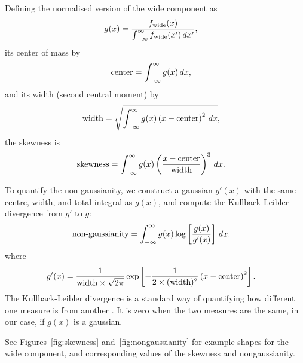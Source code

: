 \documentclass[a4paper, 12pt]{article}
\newcommand{\x}{x}
\begin{document}
Defining the normalised version of the wide component as
\begin{align}
g(\x) &= \frac{f_{\rm wide}(\x)}
             {\int_{-\infty}^\infty f_{\rm wide}(\x') \, d\x'},
\end{align}
its center of mass by
\begin{align}
\textnormal{center} &= \int_{-\infty}^\infty g(\x) \, d\x,
\end{align}
and its width (second central moment) by
\begin{align}
\textnormal{width} &= \sqrt{\int_{-\infty}^\infty
                            g(\x) \left(\x - \textnormal{center}\right)^2
                            \, d\x},
\end{align}
the skewness is
\begin{align}
\textnormal{skewness} &= \int_{-\infty}^\infty
                           g(\x) 
                           \left(
                             \frac{x - \textnormal{center}}{\textnormal{width}}
                           \right)^3
                         \, d\x.
\end{align}

To quantify the non-gaussianity, we construct a gaussian
$g'(\x)$
with the same centre, width, and total integral as $g(\x)$, and compute the
Kullback-Leibler divergence from $g'$ to $g$:
\begin{align}
\textnormal{non-gaussianity} &= 
    \int_{-\infty}^\infty g(\x) \log\left[\frac{g(\x)}{g'(\x)}\right] \, d\x.
\end{align}
where
\begin{align}
g'(\x) &= \frac{1}{\textnormal{width} \times \sqrt{2\pi}}
            \exp\left[-\frac{1}{2\times (\textnormal{width})^2}
                    \left(\x - \textnormal{center}\right)^2\right].
\end{align}
The Kullback-Leibler divergence is a standard way of quantifying how
different one measure is from another \citep{knuth2012foundations}.
It is zero when the two measures are the same, in our case,
if $g(\x)$ is a gaussian.

See Figures~\ref{fig:skewness} and~\ref{fig:nongaussianity} for example
shapes for the wide component, and corresponding values of the skewness
and nongaussianity.
\end{document}
